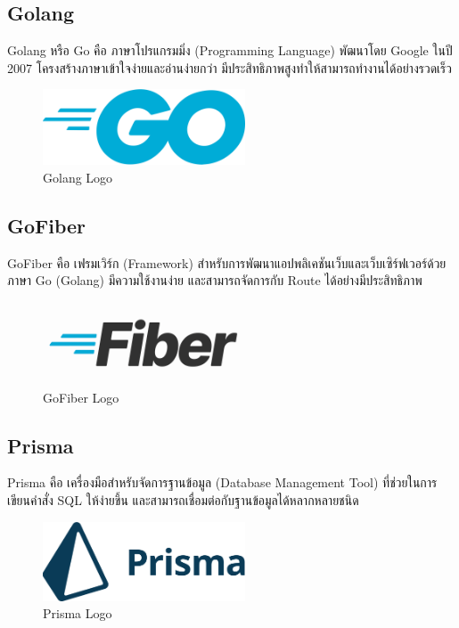 \newpage

\subsection{Golang}

Golang หรือ Go คือ ภาษาโปรแกรมมิ่ง (Programming Language) พัฒนาโดย Google ในปี 2007 โครงสร้างภาษาเข้าใจง่ายและอ่านง่ายกว่า มีประสิทธิภาพสูงทำให้สามารถทำงานได้อย่างรวดเร็ว \cite{WhatIsGolang}

\begin{figure}[H]
    \centering
    \includegraphics[width=60mm,scale=1.0]{images/golang.png}
    \caption{Golang Logo}
    \label{fig:golang}
\end{figure}

\subsection{GoFiber}

GoFiber คือ เฟรมเวิร์ก (Framework) สำหรับการพัฒนาแอปพลิเคชันเว็บและเว็บเซิร์ฟเวอร์ด้วยภาษา Go (Golang) มีความใช้งานง่าย และสามารถจัดการกับ Route ได้อย่างมีประสิทธิภาพ \cite{FiberAndGormRunGolangApp}

\begin{figure}[H]
    \centering
    \includegraphics[width=60mm,scale=1.0]{images/gofiber.png}
    \caption{GoFiber Logo}
    \label{fig:gofiber}
\end{figure}

\subsection{Prisma}

Prisma คือ เครื่องมือสำหรับจัดการฐานข้อมูล (Database Management Tool) ที่ช่วยในการเขียนคำสั่ง SQL ให้ง่ายขึ้น และสามารถเชื่อมต่อกับฐานข้อมูลได้หลากหลายชนิด \cite{WhatIsPrisma}

\begin{figure}[H]
    \centering
    \includegraphics[width=60mm,scale=1.0]{images/prisma.png}
    \caption{Prisma Logo}
    \label{fig:prisma}
\end{figure}

